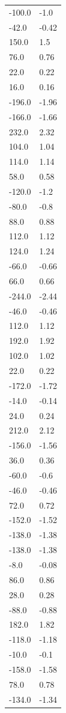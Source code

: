 \begin{longtable}{ll}
-100.0 & -1.0 \\
-42.0 & -0.42 \\
150.0 & 1.5 \\
76.0 & 0.76 \\
22.0 & 0.22 \\
16.0 & 0.16 \\
-196.0 & -1.96 \\
-166.0 & -1.66 \\
232.0 & 2.32 \\
104.0 & 1.04 \\
114.0 & 1.14 \\
58.0 & 0.58 \\
-120.0 & -1.2 \\
-80.0 & -0.8 \\
88.0 & 0.88 \\
112.0 & 1.12 \\
124.0 & 1.24 \\
-66.0 & -0.66 \\
66.0 & 0.66 \\
-244.0 & -2.44 \\
-46.0 & -0.46 \\
112.0 & 1.12 \\
192.0 & 1.92 \\
102.0 & 1.02 \\
22.0 & 0.22 \\
-172.0 & -1.72 \\
-14.0 & -0.14 \\
24.0 & 0.24 \\
212.0 & 2.12 \\
-156.0 & -1.56 \\
36.0 & 0.36 \\
-60.0 & -0.6 \\
-46.0 & -0.46 \\
72.0 & 0.72 \\
-152.0 & -1.52 \\
-138.0 & -1.38 \\
-138.0 & -1.38 \\
-8.0 & -0.08 \\
86.0 & 0.86 \\
28.0 & 0.28 \\
-88.0 & -0.88 \\
182.0 & 1.82 \\
-118.0 & -1.18 \\
-10.0 & -0.1 \\
-158.0 & -1.58 \\
78.0 & 0.78 \\
-134.0 & -1.34 \\

\end{longtable}
